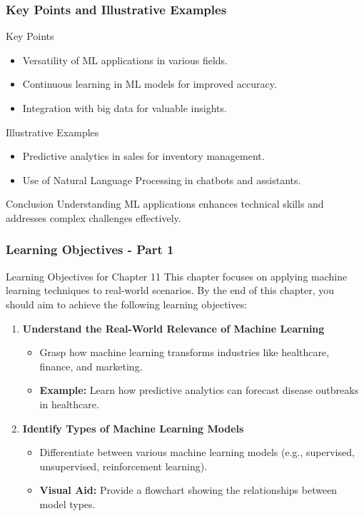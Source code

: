 \documentclass[aspectratio=169]{beamer}
\begin{document}
\begin{frame}[fragile]
    \frametitle{Key Points and Illustrative Examples}
    \begin{block}{Key Points}
        \begin{itemize}
            \item Versatility of ML applications in various fields.
            \item Continuous learning in ML models for improved accuracy.
            \item Integration with big data for valuable insights.
        \end{itemize}
    \end{block}
    \begin{block}{Illustrative Examples}
        \begin{itemize}
            \item Predictive analytics in sales for inventory management.
            \item Use of Natural Language Processing in chatbots and assistants.
        \end{itemize}
    \end{block}
    \begin{block}{Conclusion}
        Understanding ML applications enhances technical skills and addresses complex challenges effectively.
    \end{block}
\end{frame}

\begin{frame}[fragile]
    \frametitle{Learning Objectives - Part 1}
    \begin{block}{Learning Objectives for Chapter 11}
        This chapter focuses on applying machine learning techniques to real-world scenarios. By the end of this chapter, you should aim to achieve the following learning objectives:
    \end{block}
    \begin{enumerate}
        \item \textbf{Understand the Real-World Relevance of Machine Learning}
        \begin{itemize}
            \item Grasp how machine learning transforms industries like healthcare, finance, and marketing.
            \item \textbf{Example:} Learn how predictive analytics can forecast disease outbreaks in healthcare.
        \end{itemize}
        
        \item \textbf{Identify Types of Machine Learning Models}
        \begin{itemize}
            \item Differentiate between various machine learning models (e.g., supervised, unsupervised, reinforcement learning).
            \item \textbf{Visual Aid:} Provide a flowchart showing the relationships between model types.
        \end{itemize}
    \end{enumerate}
\end{frame}
\end{document}
